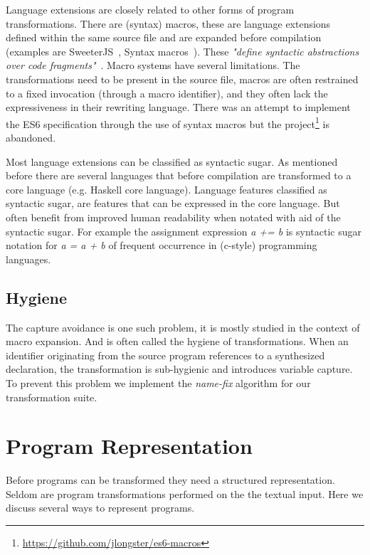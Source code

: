 Language extensions are closely related to other forms of program transformations. There are (syntax) macros\cite{Leavenworth1966}, these are language extensions defined within the same source file and are expanded before compilation (examples are SweeterJS~\cite{Disney2014}, Syntax macros~\cite{Weise1993}). These \textit{"define syntactic abstractions over code fragments"}~\cite{Bravenboer2004}. Macro systems have several limitations. The transformations need to be present in the source file, macros are often restrained to a fixed invocation (through a macro identifier), and they often lack the expressiveness in their rewriting language\cite{Bravenboer2004}. There was an attempt to implement the ES6 specification through the use of syntax macros but the project\footnote{\url{https://github.com/jlongster/es6-macros}} is abandoned.

Most language extensions can be classified as syntactic sugar. As mentioned before there are several languages that before compilation are transformed to a core language (e.g. Haskell core language).  Language features classified as syntactic sugar, are features that can be expressed in the core language. But often benefit from improved human readability when notated with aid of the syntactic sugar. For example the assignment expression \textit{a += b} is syntactic sugar notation for \textit{a = a + b} of frequent occurrence in (c-style) programming languages.

\subsection{Hygiene} \label{hygiene}
The capture avoidance is one such problem, it is mostly studied in the context of macro expansion\cite{Herman2010a,Herman2010,Disney2014}. And is often called the hygiene of transformations. When an identifier originating from the source program references to a synthesized declaration, the transformation is sub-hygienic and introduces variable capture. To prevent this problem we implement the \textit{name-fix} algorithm\cite{Erdweg2014} for our transformation suite.

\section{Program Representation} \label{program-representation}
Before programs can be transformed they need a structured representation. Seldom are program transformations performed on the the textual input. Here we discuss several ways to represent programs.


